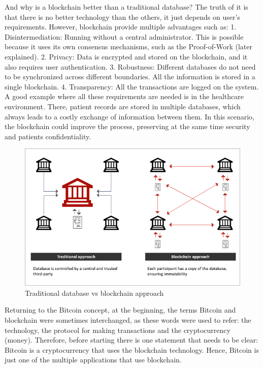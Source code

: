 And why is a blockchain better than a traditional database? The truth of it is that there is no better technology than the others, it just depends on user's requirements. However, blockchain provide multiple advantages such as: 1. Disintermediation: Running without a central administrator. This is possible because it uses its own consensus mechanisms, such as the Proof-of-Work (later explained). 2. Privacy: Data is encrypted and stored on the blockchain, and it also requires user authentication. 3. Robustness: Different databases do not need to be synchronized across different boundaries. All the information is stored in a single blockchain. 4. Transparency: All the transactions are logged on the system. A good example where all these requirements are needed is in the healthcare environment. There, patient records are stored in multiple databases, which always leads to a costly exchange of information between them. In this scenario, the blockchain could improve the process, preserving at the same time security and patients confidentiality.


\begin{figure}
  \centering
  	\includegraphics[scale=0.8]{gfx/centralization_vs_decentralization.png}
  \caption{Traditional database vs blockchain approach}
  \label{fig:CentralizedvsDecentralized}
\end{figure}

Returning to the Bitcoin concept, at the beginning, the terms Bitcoin and blockchain were sometimes interchanged, as these words were used to refer: the technology, the protocol for making transactions and the cryptocurrency (money). Therefore, before starting there is one statement that needs to be clear: Bitcoin is a cryptocurrency that uses the blockchain technology. Hence, Bitcoin is just one of the multiple applications that use blockchain. 

